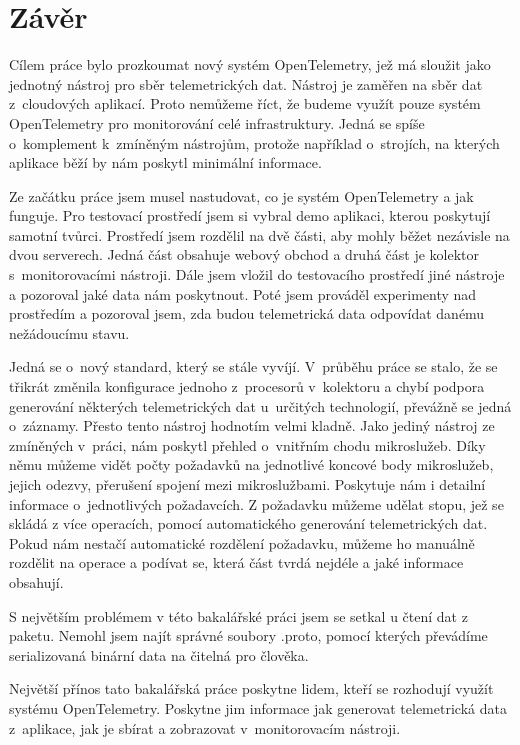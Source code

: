 \chapter{Závěr}

Cílem práce bylo prozkoumat nový systém OpenTelemetry, jež má sloužit jako jednotný nástroj pro sběr telemetrických dat. Nástroj je zaměřen na sběr dat z~cloudových aplikací. Proto nemůžeme říct, že budeme využít pouze systém OpenTelemetry pro monitorování celé infrastruktury. Jedná se spíše o~komplement k~zmíněným nástrojům, protože například o~strojích, na kterých aplikace běží by nám poskytl minimální informace.

Ze začátku práce jsem musel nastudovat, co je systém OpenTelemetry a jak funguje. Pro testovací prostředí jsem si vybral demo aplikaci, kterou poskytují samotní tvůrci. Prostředí jsem rozdělil na dvě části, aby mohly běžet nezávisle na dvou serverech. Jedná část obsahuje webový obchod a druhá část je kolektor s~monitorovacími nástroji. Dále jsem vložil do testovacího prostředí jiné nástroje a pozoroval jaké data nám poskytnout. Poté jsem prováděl experimenty nad prostředím a pozoroval jsem, zda budou telemetrická data odpovídat danému nežádoucímu stavu.


Jedná se o~nový standard, který se stále vyvíjí. V~průběhu práce se stalo, že se třikrát změnila konfigurace jednoho z~procesorů v~kolektoru a chybí podpora generování některých telemetrických dat u~určitých technologií, převážně se jedná o~záznamy. Přesto tento nástroj hodnotím velmi kladně. Jako jediný nástroj ze zmíněných v~práci, nám poskytl přehled o~vnitřním chodu mikroslužeb. Díky němu můžeme vidět počty požadavků na jednotlivé koncové body mikroslužeb, jejich odezvy, přerušení spojení mezi mikroslužbami. Poskytuje nám i detailní informace o~jednotlivých požadavcích. Z požadavku můžeme udělat stopu, jež se skládá z více operacích, pomocí automatického generování telemetrických dat. Pokud nám nestačí automatické rozdělení požadavku, můžeme ho manuálně rozdělit na operace a podívat se, která část tvrdá nejdéle a jaké informace obsahují.

S největším problémem v této bakalářské práci jsem se setkal u čtení dat z paketu. Nemohl jsem najít správné soubory .proto, pomocí kterých převádíme serializovaná binární data na čitelná pro člověka.

Největší přínos tato bakalářská práce poskytne lidem, kteří se rozhodují využít systému OpenTelemetry. Poskytne jim informace jak generovat telemetrická data z~aplikace, jak je sbírat a zobrazovat v~monitorovacím nástroji.



